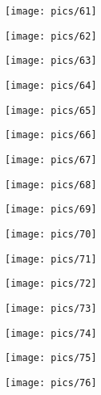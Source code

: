 \documentclass[a4paper,10pt]{article}
\begin{document}
\begin{center}
    \texttt{[image: pics/61]}
\vspace{1em}




    \texttt{[image: pics/62]}
\vspace{1em}




    \texttt{[image: pics/63]}
\vspace{1em}




    \texttt{[image: pics/64]}
\vspace{1em}




    \texttt{[image: pics/65]}
\vspace{1em}



    \texttt{[image: pics/66]}
\vspace{1em}



    \texttt{[image: pics/67]}
\vspace{1em}



    \texttt{[image: pics/68]}
\vspace{1em}



    \texttt{[image: pics/69]}
\vspace{1em}



    \texttt{[image: pics/70]}
\vspace{1em}




    \texttt{[image: pics/71]}
\vspace{1em}




    \texttt{[image: pics/72]}
\vspace{1em}




    \texttt{[image: pics/73]}
\vspace{1em}




    \texttt{[image: pics/74]}
\vspace{1em}




    \texttt{[image: pics/75]}
\vspace{1em}


    \texttt{[image: pics/76]}
    
    \label{pg_BF_keys_finish}

\end{center}
\end{document}
